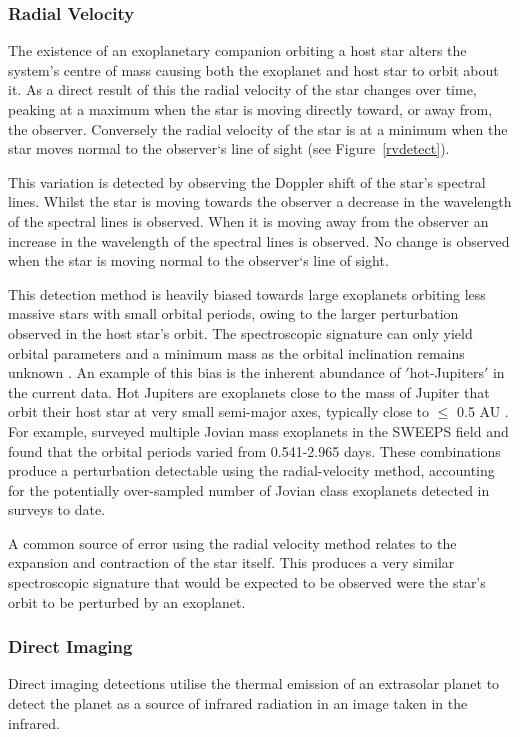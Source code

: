 \documentclass{report}
\begin{document}
\subsubsection{Radial Velocity }

The existence of an exoplanetary companion orbiting a host star alters the system's centre of mass causing both the exoplanet and host star to orbit about it. As a direct result of this the radial velocity of the star changes over time, peaking at a maximum when the star is moving directly toward, or away from, the observer. Conversely the radial velocity of the star is at a minimum when the star moves normal to the observer`s line of sight (see Figure~\ref{rvdetect}).

This variation is detected by observing the Doppler shift of the star’s spectral lines. Whilst the star is moving towards the observer a decrease in the wavelength of the spectral lines is observed. When it is moving away from the observer an increase in the wavelength of the spectral lines is observed. No change is observed when the star is moving normal to the observer`s line of sight. 

This detection method is heavily biased towards large exoplanets orbiting less massive stars with small orbital periods, owing to the larger perturbation observed in the host star’s orbit. The spectroscopic signature can only yield orbital parameters and a minimum mass as the orbital inclination remains unknown \parencite{stats}. An example of this bias is the inherent abundance of $'$hot-Jupiters$'$ in the current data. Hot Jupiters are exoplanets close to the mass of Jupiter that orbit their host star at very small semi-major axes, typically close to $\leq$ 0.5 AU \parencite{hotjupiter}. For example, \textcite{sweeps} surveyed multiple Jovian mass exoplanets in the SWEEPS field and found that the orbital periods varied from 0.541-2.965 days. These combinations produce a perturbation detectable using the radial-velocity method, accounting for the potentially over-sampled number of Jovian class exoplanets detected in surveys to date.

A common source of error using the radial velocity method relates to the expansion and contraction of the star itself. This produces a very similar spectroscopic signature that would be expected to be observed were the star's orbit to be perturbed by an exoplanet.

\subsubsection{Direct Imaging }
Direct imaging detections utilise the thermal emission of an extrasolar planet to detect the planet as a source of infrared radiation in an image taken in the infrared. 
\end{document}
